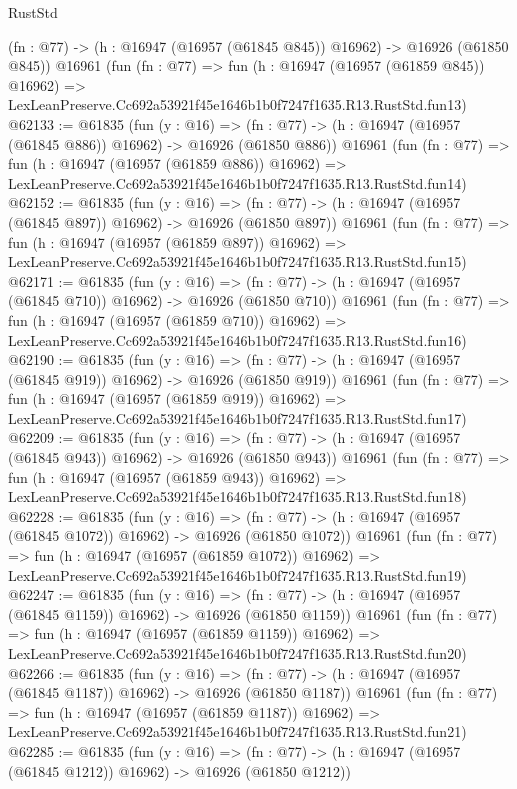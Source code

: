 \begin{lexlean}{RustStd}
\begin{coremodule}
    (fn : @77) -> (h : @16947 (@16957 (@61845 @845)) @16962) -> @16926 (@61850 @845))
    @16961
    (fun (fn : @77) =>
    fun (h : @16947 (@16957 (@61859 @845)) @16962) =>
    LexLeanPreserve.Cc692a53921f45e1646b1b0f7247f1635.R13.RustStd.fun13)
@62133 := @61835
    (fun (y : @16) =>
    (fn : @77) -> (h : @16947 (@16957 (@61845 @886)) @16962) -> @16926 (@61850 @886))
    @16961
    (fun (fn : @77) =>
    fun (h : @16947 (@16957 (@61859 @886)) @16962) =>
    LexLeanPreserve.Cc692a53921f45e1646b1b0f7247f1635.R13.RustStd.fun14)
@62152 := @61835
    (fun (y : @16) =>
    (fn : @77) -> (h : @16947 (@16957 (@61845 @897)) @16962) -> @16926 (@61850 @897))
    @16961
    (fun (fn : @77) =>
    fun (h : @16947 (@16957 (@61859 @897)) @16962) =>
    LexLeanPreserve.Cc692a53921f45e1646b1b0f7247f1635.R13.RustStd.fun15)
@62171 := @61835
    (fun (y : @16) =>
    (fn : @77) -> (h : @16947 (@16957 (@61845 @710)) @16962) -> @16926 (@61850 @710))
    @16961
    (fun (fn : @77) =>
    fun (h : @16947 (@16957 (@61859 @710)) @16962) =>
    LexLeanPreserve.Cc692a53921f45e1646b1b0f7247f1635.R13.RustStd.fun16)
@62190 := @61835
    (fun (y : @16) =>
    (fn : @77) -> (h : @16947 (@16957 (@61845 @919)) @16962) -> @16926 (@61850 @919))
    @16961
    (fun (fn : @77) =>
    fun (h : @16947 (@16957 (@61859 @919)) @16962) =>
    LexLeanPreserve.Cc692a53921f45e1646b1b0f7247f1635.R13.RustStd.fun17)
@62209 := @61835
    (fun (y : @16) =>
    (fn : @77) -> (h : @16947 (@16957 (@61845 @943)) @16962) -> @16926 (@61850 @943))
    @16961
    (fun (fn : @77) =>
    fun (h : @16947 (@16957 (@61859 @943)) @16962) =>
    LexLeanPreserve.Cc692a53921f45e1646b1b0f7247f1635.R13.RustStd.fun18)
@62228 := @61835
    (fun (y : @16) =>
    (fn : @77) -> (h : @16947 (@16957 (@61845 @1072)) @16962) -> @16926 (@61850 @1072))
    @16961
    (fun (fn : @77) =>
    fun (h : @16947 (@16957 (@61859 @1072)) @16962) =>
    LexLeanPreserve.Cc692a53921f45e1646b1b0f7247f1635.R13.RustStd.fun19)
@62247 := @61835
    (fun (y : @16) =>
    (fn : @77) -> (h : @16947 (@16957 (@61845 @1159)) @16962) -> @16926 (@61850 @1159))
    @16961
    (fun (fn : @77) =>
    fun (h : @16947 (@16957 (@61859 @1159)) @16962) =>
    LexLeanPreserve.Cc692a53921f45e1646b1b0f7247f1635.R13.RustStd.fun20)
@62266 := @61835
    (fun (y : @16) =>
    (fn : @77) -> (h : @16947 (@16957 (@61845 @1187)) @16962) -> @16926 (@61850 @1187))
    @16961
    (fun (fn : @77) =>
    fun (h : @16947 (@16957 (@61859 @1187)) @16962) =>
    LexLeanPreserve.Cc692a53921f45e1646b1b0f7247f1635.R13.RustStd.fun21)
@62285 := @61835
    (fun (y : @16) =>
    (fn : @77) -> (h : @16947 (@16957 (@61845 @1212)) @16962) -> @16926 (@61850 @1212))

\end{coremodule}
\end{lexlean}
